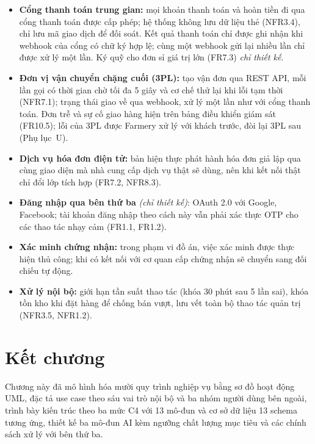 \begin{itemize}
    \item \textbf{Cổng thanh toán trung gian:} mọi khoản thanh toán và hoàn tiền đi qua cổng thanh toán được cấp phép; hệ thống không lưu dữ liệu thẻ (NFR3.4), chỉ lưu mã giao dịch để đối soát. Kết quả thanh toán chỉ được ghi nhận khi webhook của cổng có chữ ký hợp lệ; cùng một webhook gửi lại nhiều lần chỉ được xử lý một lần. Ký quỹ cho đơn sỉ giá trị lớn (FR7.3) \emph{chỉ thiết kế}.
    \item \textbf{Đơn vị vận chuyển chặng cuối (3PL):} tạo vận đơn qua REST API, mỗi lần gọi có thời gian chờ tối đa 5 giây và cơ chế thử lại khi lỗi tạm thời (NFR7.1); trạng thái giao về qua webhook, xử lý một lần như với cổng thanh toán. Đơn trễ và sự cố giao hàng hiện trên bảng điều khiển giám sát (FR10.5); lỗi của 3PL được Farmery xử lý với khách trước, đòi lại 3PL sau (Phụ lục~U).
    \item \textbf{Dịch vụ hóa đơn điện tử:} bản hiện thực phát hành hóa đơn giả lập qua cùng giao diện mà nhà cung cấp dịch vụ thật sẽ dùng, nên khi kết nối thật chỉ đổi lớp tích hợp (FR7.2, NFR8.3).
    \item \textbf{Đăng nhập qua bên thứ ba} \emph{(chỉ thiết kế)}: OAuth 2.0 với Google, Facebook; tài khoản đăng nhập theo cách này vẫn phải xác thực OTP cho các thao tác nhạy cảm (FR1.1, FR1.2).
    \item \textbf{Xác minh chứng nhận:} trong phạm vi đồ án, việc xác minh được thực hiện thủ công; khi có kết nối với cơ quan cấp chứng nhận sẽ chuyển sang đối chiếu tự động.
    \item \textbf{Xử lý nội bộ:} giới hạn tần suất thao tác (khóa 30 phút sau 5 lần sai), khóa tồn kho khi đặt hàng để chống bán vượt, lưu vết toàn bộ thao tác quản trị (NFR3.5, NFR1.2).
\end{itemize}

\section{Kết chương}

Chương này đã mô hình hóa mười quy trình nghiệp vụ bằng sơ đồ hoạt động UML, đặc tả use case theo sáu vai trò nội bộ và ba nhóm người dùng bên ngoài, trình bày kiến trúc theo ba mức C4 với 13 mô-đun và cơ sở dữ liệu 13 schema tương ứng, thiết kế ba mô-đun AI kèm ngưỡng chất lượng mục tiêu và các chính sách xử lý với bên thứ ba.
